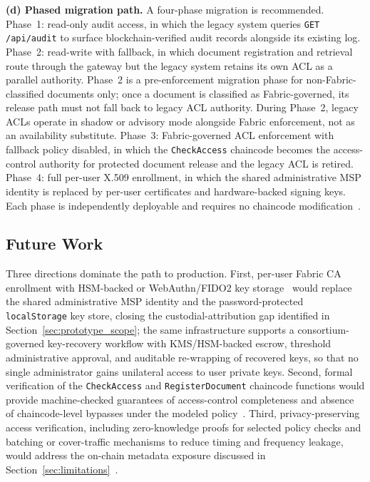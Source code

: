 \documentclass[preprint,12pt]{elsarticle}
\begin{document}
\textbf{(d) Phased migration path.} A four-phase migration is
recommended. Phase~1: read-only audit access, in which the legacy
system queries \texttt{GET /api/audit} to surface blockchain-verified
audit records alongside its existing log. Phase~2: read-write with
fallback, in which document registration and retrieval route through
the gateway but the legacy system retains its own ACL as a parallel
authority. Phase~2 is a pre-enforcement migration phase for
non-Fabric-classified documents only; once a document is classified as
Fabric-governed, its release path must not fall back to legacy ACL
authority. During Phase~2, legacy ACLs operate in shadow or advisory mode
alongside Fabric enforcement, not as an availability substitute. Phase~3: Fabric-governed ACL enforcement with fallback policy
disabled, in which the \texttt{CheckAccess} chaincode becomes the
access-control authority for protected document release and the
legacy ACL is retired. Phase~4: full per-user
X.509 enrollment, in which the shared administrative MSP identity is
replaced by per-user certificates and hardware-backed signing keys.
Each phase is independently deployable and requires no chaincode
modification~\cite{fabricChaincodeLifecycleDoc,nist80053}.

\subsection{Future Work}
\label{sec:future_work}
\label{sec:key_recovery_escrow}
\label{sec:regulator_interfaces}

Three directions dominate the path to production. First, per-user Fabric
CA enrollment with HSM-backed or WebAuthn/FIDO2 key
storage~\cite{fips1403,fabricCADoc,w3cWebAuthnL3} would replace the shared
administrative MSP identity and the password-protected
\texttt{localStorage} key store, closing the custodial-attribution gap
identified in Section~\ref{sec:prototype_scope}; the same infrastructure
supports a consortium-governed key-recovery workflow with KMS/HSM-backed
escrow, threshold administrative approval, and auditable re-wrapping of
recovered keys, so that no single administrator gains unilateral access to
user private keys. Second, formal verification of the \texttt{CheckAccess}
and \texttt{RegisterDocument} chaincode functions would provide
machine-checked guarantees of access-control completeness and absence of
chaincode-level bypasses under the modeled policy~\cite{permenev2020verx}.
Third, privacy-preserving access verification, including zero-knowledge
proofs for selected policy checks and batching or cover-traffic mechanisms
to reduce timing and frequency leakage, would address the on-chain
metadata exposure discussed in
Section~\ref{sec:limitations}~\cite{groth2016,fabricPDCDoc}.
\end{document}
